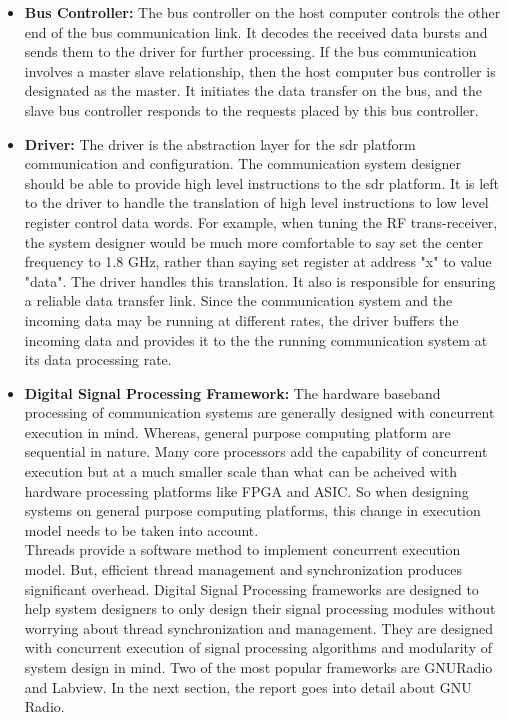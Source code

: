 \begin{itemize}
\item{\textbf{Bus Controller:} The bus controller on the host computer controls the other end of the bus communication link.
It decodes the received data bursts and sends them to the driver for further processing.
If the bus communication involves a master slave relationship, then the host computer bus controller is designated as the master.
It initiates the data transfer on the bus, and the slave bus controller  responds to the requests placed by this bus controller.
}
\item{\textbf{Driver:} The driver is the abstraction layer for the \ac{sdr} platform communication and configuration.
The communication system designer should be able to provide high level instructions to the \ac{sdr} platform.
It is left to the driver to handle the translation of high level instructions to low level register control data words.
For example, when tuning the RF trans-receiver, the system designer would be much more comfortable to say set the center frequency to 1.8 GHz, rather than saying set register at address "x" to value "data".
The driver handles this translation.
It also is responsible for ensuring a reliable data transfer link.
Since the communication system and the incoming data may be running at different rates, the driver buffers the incoming data and provides it to the the running communication system at its data processing rate.}
\item{\textbf{Digital Signal Processing Framework:} The hardware baseband processing of communication systems are generally designed with concurrent execution in mind.
Whereas, general purpose computing platform are sequential in nature. Many core processors add the capability of concurrent execution but at a much smaller scale than what can be acheived with hardware processing platforms like \ac{FPGA} and \ac{ASIC}.
So when designing systems on general purpose computing platforms, this change in execution model needs to be taken into account.\\

Threads provide a software method to implement concurrent execution model. 
But, efficient thread management and synchronization produces significant overhead.
Digital Signal Processing frameworks are designed to help system designers to only design their signal processing modules without worrying about thread synchronization and management.
They are designed with concurrent execution of signal processing algorithms and modularity of system design in mind.
Two of the most popular frameworks are GNURadio and Labview.
In the next section, the report goes into detail about GNU Radio. 
}
\end{itemize}
